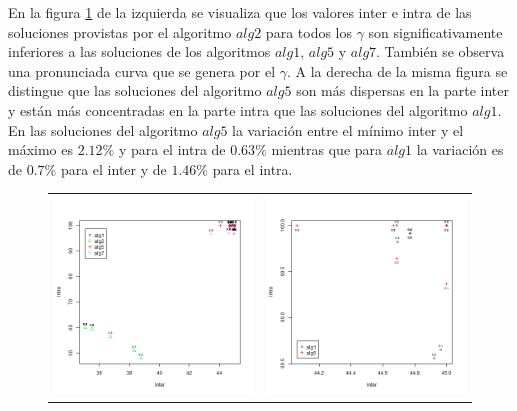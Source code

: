 En la figura \ref{res:aut_alg1_vs_alg5_vs_alg7} de la izquierda se visualiza que los valores inter e intra de las soluciones provistas por el algoritmo $alg2$ para todos los $\gamma$ son significativamente inferiores a las soluciones de los algoritmos $alg1$, $alg5$ y $alg7$. También se observa una pronunciada curva que se genera por el $\gamma$. A la derecha de la misma figura se distingue que las soluciones del algoritmo $alg5$ son más dispersas en la parte inter y están más concentradas en la parte intra que las soluciones del algoritmo $alg1$. En las soluciones del algoritmo $alg5$ la variación entre el mínimo inter y el máximo es $2.12\%$ y para el intra de $0.63\%$ mientras que para $alg1$ la variación es de $0.7\%$ para el inter y de $1.46\%$ para el intra.
\begin{figure}[H]
	\centering
	\begin{tabular}{cc}
			\includegraphics[width=0.5\linewidth]{img/aut-alg1-alg2-alg5-alg7.png}&
			\includegraphics[width=0.5\linewidth]{img/aut-alg1-alg5.png}\\
	\end{tabular}
	\caption{}
	\label{res:aut_alg1_vs_alg5_vs_alg7}
\end{figure}



